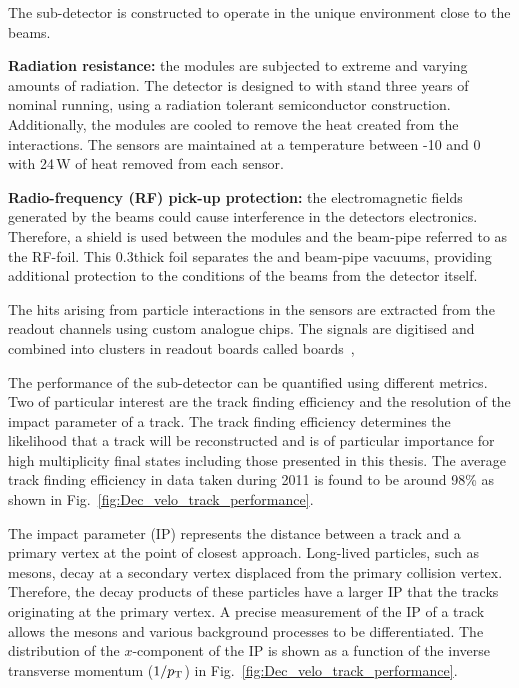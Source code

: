 The \velo sub-detector is constructed to operate in the unique environment close to the \lhc beams.
\begin{description}   
\item \textbf{Radiation resistance:} the \velo modules are subjected to extreme and varying amounts of radiation. The detector is designed to with stand three years of nominal \lhc running, using a radiation tolerant semiconductor construction. Additionally, the \velo modules are cooled to remove the heat created from the interactions. The sensors are maintained at a temperature between -10 and 0 with 24\,W of heat removed from each sensor.  
\item \textbf{Radio-frequency (RF) pick-up protection:} the electromagnetic fields generated by the \lhc beams could cause interference in the \velo detectors electronics. Therefore, a shield is used between the modules and the beam-pipe referred to as the RF-foil. This 0.3\mm thick foil separates the \velo and beam-pipe vacuums, providing additional protection to the conditions of the beams from the \velo detector itself.
\end{description}   

The hits arising from particle interactions in the \velo sensors are extracted from the readout channels using custom analogue chips. The signals are digitised and combined into clusters in readout boards called \tellone boards~\cite{HAEFELI2006494}, 


The performance of the \velo sub-detector can be quantified using different metrics. Two of particular interest are the track finding efficiency and the resolution of the impact parameter of a track. 
The track finding efficiency determines the likelihood that a track will be reconstructed and is of particular importance for high multiplicity final states including those presented in this thesis. The average track finding efficiency in data taken during 2011 is found to be around 98\% as shown in Fig.~\ref{fig:Dec_velo_track_performance}.

The impact parameter (IP) represents the distance between a track and a primary vertex at the point of closest approach. Long-lived particles, such as \Bp mesons, decay at a secondary vertex displaced from the primary collision vertex. Therefore, the decay products of these particles have a larger IP that the tracks originating at the primary vertex. A precise measurement of the IP of a track allows the \Bp mesons and various background processes to be differentiated. The distribution of the $x$-component of the IP is shown as a function of the inverse transverse momentum ($1/\mbox{$p_{\mathrm{ T}}$}$) in Fig.~\ref{fig:Dec_velo_track_performance}.  

